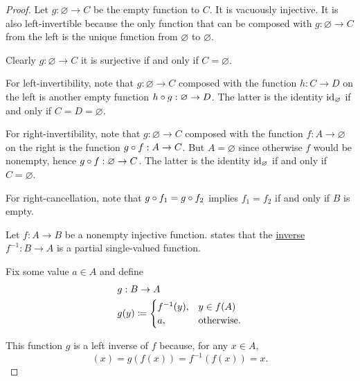 \begin{proof}
   Let \( g: \varnothing \to C \) be the empty function to \( C \). It is vacuously injective. It is also left-invertible because the only function that can be composed with \( g: \varnothing \to C \) from the left is the unique function from \( \varnothing \) to \( \varnothing \).

  Clearly \( g: \varnothing \to C \) it is surjective if and only if \( C = \varnothing \).

  For left-invertibility, note that \( g: \varnothing \to C \) composed with the function \( h: C \to D \) on the left is another empty function \( h \bincirc g: \varnothing \to D \). The latter is the identity \( \operatorname{id}_\varnothing \) if and only if \( C = D = \varnothing \).

  For right-invertibility, note that \( g: \varnothing \to C \) composed with the function \( f: A \to \varnothing \) on the right is the function \( g \bincirc f: A \to C \). But \( A = \varnothing \) since otherwise \( f \) would be nonempty, hence \( g \bincirc f: \varnothing \to C \). The latter is the identity \( \operatorname{id}_\varnothing \) if and only if \( C = \varnothing \).

  For right-cancellation, note that \( g \bincirc f_1 = g \bincirc f_2 \) implies \( f_1 = f_2 \) if and only if \( B \) is empty.

   Let \( f: A \to B \) be a nonempty injective function.  states that the \hyperref[def:multi_valued_function/inverse]{inverse} \( f^{-1}: B \to A \) is a partial single-valued function.

  Fix some value \( a \in A \) and define
  \begin{equation*}
    \begin{aligned}
      &g: B \to A \\
      &g(y) \coloneqq \begin{cases}
        f^{-1}(y), &y \in f(A) \\
        a,         &\T{otherwise.}
      \end{cases}
    \end{aligned}
  \end{equation*}

  This function \( g \) is a left inverse of \( f \) because, for any \( x \in A \),
  \begin{equation*}
    [g \bincirc f](x)
    =
    g(f(x))
    =
    f^{-1}(f(x))
    =
    x.
  \end{equation*}


\end{proof}
